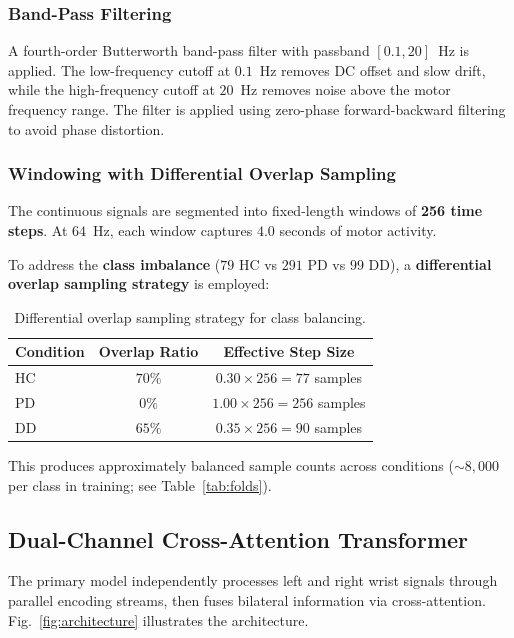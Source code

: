 \documentclass[conference]{IEEEtran}
\begin{document}
\subsubsection{Band-Pass Filtering}
A fourth-order Butterworth band-pass filter with passband $[0.1, 20]$~Hz is applied. The low-frequency cutoff at $0.1$~Hz removes DC offset and slow drift, while the high-frequency cutoff at $20$~Hz removes noise above the motor frequency range. The filter is applied using zero-phase forward-backward filtering to avoid phase distortion.

\subsubsection{Windowing with Differential Overlap Sampling}
\label{sec:windowing}
The continuous signals are segmented into fixed-length windows of \textbf{256 time steps}. At $64$~Hz, each window captures $4.0$ seconds of motor activity.

To address the \textbf{class imbalance} ($79$ HC vs $291$ PD vs $99$ DD), a \textbf{differential overlap sampling strategy} is employed:

\begin{table}[H]
\centering
\caption{Differential overlap sampling strategy for class balancing.}
\label{tab:overlap}
\begin{tabular}{lcc}
\toprule
\textbf{Condition} & \textbf{Overlap Ratio} & \textbf{Effective Step Size} \\
\midrule
HC  & $70\%$ & $0.30 \times 256 = 77$ samples \\
PD  & $0\%$  & $1.00 \times 256 = 256$ samples \\
DD  & $65\%$ & $0.35 \times 256 = 90$ samples \\
\bottomrule
\end{tabular}
\end{table}

This produces approximately balanced sample counts across conditions ($\sim 8{,}000$ per class in training; see Table~\ref{tab:folds}).

\subsection{Dual-Channel Cross-Attention Transformer}
\label{sec:base_model}

The primary model independently processes left and right wrist signals through parallel encoding streams, then fuses bilateral information via cross-attention. Fig.~\ref{fig:architecture} illustrates the architecture.
\end{document}
